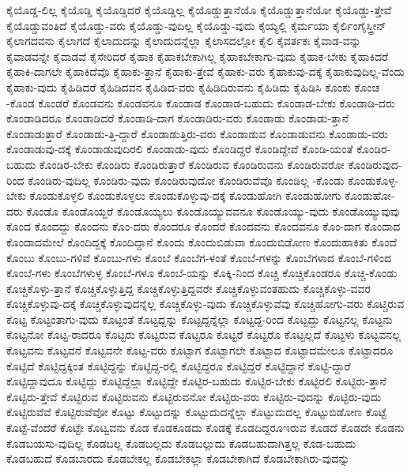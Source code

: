 {ಕೈಯೊಡ್ಡ-ಲಿಲ್ಲ
ಕೈಯೊಡ್ಡಿ
ಕೈಯೊಡ್ಡಿದರೆ
ಕೈಯೊಡ್ಡಿಲ್ಲ
ಕೈಯೊಡ್ಡುತ್ತಾನೆಯೊ
ಕೈಯೊಡ್ಡುತ್ತಾನೆಯೋ
ಕೈಯೊಡ್ಡು-ತ್ತೇವೆ
ಕೈಯೊಡ್ಡುವಂತಿದೆ
ಕೈಯೊಡ್ಡು-ವರು
ಕೈಯೊಡ್ಡು-ವುದಿಲ್ಲ
ಕೈಯೊಡ್ಡು-ವುದು
ಕೈಯ್ಯಲ್ಲಿ
ಕೈರ್ಮಯಾ
ಕೈರ್ಲಿಂಗೈಸ್ತ್ರೀನ್
ಕೈಲಾಗದವನು
ಕೈಲಾಗದೆ
ಕೈಲಾದುದನ್ನು
ಕೈಲಾದುದನ್ನೆಲ್ಲಾ
ಕೈಲಾಸದಲ್ಲೋ
ಕೈಲಿ
ಕೈವರ್ತಕಃ
ಕೈವಾಡ-ವನ್ನು
ಕೈವಾಡವನ್ನೇ
ಕೈವಾಡವೆ
ಕೈಸೇರಿದರೆ
ಕೈಹಾಕ
ಕೈಹಾಕಬೇಕಾಗಿಲ್ಲ
ಕೈಹಾಕಬೇಕಾಗು-ವುದು
ಕೈಹಾಕ-ಬೇಕು
ಕೈಹಾಕಿದರೆ
ಕೈಹಾಕಿ-ದಾಗಲೇ
ಕೈಹಾಕಿದೆವೊ
ಕೈಹಾಕು-ತ್ತಾನೆ
ಕೈಹಾಕು-ತ್ತೇವೆ
ಕೈಹಾಕು-ವರು
ಕೈಹಾಕುವು-ದಕ್ಕೆ
ಕೈಹಾಕುವುದಿಲ್ಲ-ವೆಂದು
ಕೈಹಾಕು-ವುದು
ಕೈಹಿಡಿದರೆ
ಕೈಹಿಡಿದವನ
ಕೈಹಿಡಿದ-ವರು
ಕೈಹಿಡಿದಿರುವನು
ಕೈಹಿಡಿದು
ಕೈಹಿಡಿಸಿ
ಕೊಂಕು
ಕೊಂಚ
-ಕೊಂಡ
ಕೊಂಡರೆ
ಕೊಂಡವನು
ಕೊಂಡವನೂ
ಕೊಂಡಾಡ
ಕೊಂಡಾಡ-ಬಹುದು
ಕೊಂಡಾಡ-ಬೇಕು
ಕೊಂಡಾಡಿ-ದರು
ಕೊಂಡಾಡಿದರೂ
ಕೊಂಡಾಡಿದರೆ
ಕೊಂಡಾಡಿ-ದಾಗ
ಕೊಂಡಾಡಿರು-ವರು
ಕೊಂಡಾಡು
ಕೊಂಡಾಡು-ತ್ತಾನೆ
ಕೊಂಡಾಡುತ್ತಾರೆ
ಕೊಂಡಾಡು-ತ್ತಿ-ದ್ದಾರೆ
ಕೊಂಡಾಡುತ್ತಿರು-ವರು
ಕೊಂಡಾಡುವ
ಕೊಂಡಾಡುವನು
ಕೊಂಡಾಡು-ವರು
ಕೊಂಡಾಡುವು-ದಕ್ಕೆ
ಕೊಂಡಾಡುವುದಿರಲಿ
ಕೊಂಡಾಡು-ವುದು
ಕೊಂಡಿದ್ದರೆ
ಕೊಂಡಿದ್ದೇವೆ
ಕೊಂಡಿ-ಯಂತೆ
ಕೊಂಡಿರ-ಬಹುದು
ಕೊಂಡಿರ-ಬೇಕು
ಕೊಂಡಿರು
ಕೊಂಡಿರುತ್ತಾರೆ
ಕೊಂಡಿರುವ
ಕೊಂಡಿರುವನು
ಕೊಂಡಿರುವರೋ
ಕೊಂಡಿರುವುದ-ರಿಂದ
ಕೊಂಡಿರು-ವುದಿಲ್ಲ
ಕೊಂಡಿರು-ವುದು
ಕೊಂಡಿರುವುದೋ
ಕೊಂಡಿರುವೆವೊ
ಕೊಂಡಿಲ್ಲ
-ಕೊಂಡು
ಕೊಂಡುಕೊಳ್ಳ-ಬೇಕು
ಕೊಂಡುಕೊಳ್ಳಲಿ
ಕೊಂಡುಕೊಳ್ಳಲು
ಕೊಂಡುಕೊಳ್ಳುವು-ದಕ್ಕೆ
ಕೊಂಡುಹೋಗಿ
ಕೊಂಡುಹೋಗು
ಕೊಂಡುಹೋ-ದರು
ಕೊಂಡೊ
ಕೊಂಡೊಯ್ದರೆ
ಕೊಂಡೊಯ್ಯಲು
ಕೊಂಡೊಯ್ಯುವವನೂ
ಕೊಂಡೊಯ್ಯು-ವುದು
ಕೊಂಡೊಯ್ಯುವುವು
ಕೊಂದ
ಕೊಂದದ್ದು
ಕೊಂದನು
ಕೊಂ-ದರು
ಕೊಂದರೂ
ಕೊಂದರೆ
ಕೊಂದವನು
ಕೊಂದವನೂ
ಕೊಂ-ದಾಗ
ಕೊಂದಾದ
ಕೊಂದಾದಮೇಲೆ
ಕೊಂದಿದ್ದಕ್ಕೆ
ಕೊಂದಿದ್ದಾನೆ
ಕೊಂದು
ಕೊಂದುಬಿಡುವಾ
ಕೊಂದುಬಿಡೋಣ
ಕೊಂದುಹಾಕಿತು
ಕೊಂದೆ
ಕೊಂಬು
ಕೊಂಬು-ಗಳಿವೆ
ಕೊಂಬು-ಗಳು
ಕೊಂಬೆ
ಕೊಂಬೆಗ-ಳಂತೆ
ಕೊಂಬೆ-ಗಳನ್ನು
ಕೊಂಬೆಗಳಾದ
ಕೊಂಬೆ-ಗಳಿಂದ
ಕೊಂಬೆ-ಗಳು
ಕೊಂಬೆಗಳುಳ್ಳ
ಕೊಂಬೆ-ಗಳೂ
ಕೊಂಬೆ-ಯನ್ನು
ಕೊಕ್ಕಿ-ನಿಂದ
ಕೊಚ್ಚಿ
ಕೊಚ್ಚಿಕೊಂಡರೂ
ಕೊಚ್ಚಿ-ಕೊಂಡು
ಕೊಚ್ಚಿಕೊಳ್ಳು-ತ್ತಾನೆ
ಕೊಚ್ಚಿಕೊಳ್ಳುತ್ತಿದ್ದ
ಕೊಚ್ಚಿಕೊಳ್ಳುತ್ತಿದ್ದವರೇ
ಕೊಚ್ಚಿಕೊಳ್ಳುವಂತಹುದು
ಕೊಚ್ಚಿಕೊಳ್ಳು-ವವರ
ಕೊಚ್ಚಿಕೊಳ್ಳುವು-ದಕ್ಕೆ
ಕೊಚ್ಚಿಕೊಳ್ಳುವುದನ್ನೆಲ್ಲ
ಕೊಚ್ಚಿಕೊಳ್ಳು-ವುದು
ಕೊಚ್ಚಿಕೊಳ್ಳುವೆವು
ಕೊಚ್ಚಿಹೋಗು-ವರು
ಕೊಟ್ಚಿರುವ
ಕೊಟ್ಟ
ಕೊಟ್ಟಂತಾಗು-ವುದು
ಕೊಟ್ಟಂತೆ
ಕೊಟ್ಟದ್ದನ್ನು
ಕೊಟ್ಟದ್ದನ್ನೆಲ್ಲಾ
ಕೊಟ್ಟದ್ದ-ರಿಂದ
ಕೊಟ್ಟದ್ದು
ಕೊಟ್ಟನಲ್ಲ
ಕೊಟ್ಟನು
ಕೊಟ್ಟನೋ
ಕೊಟ್ಟ-ರಾದರೂ
ಕೊಟ್ಟರು
ಕೊಟ್ಟರುವ
ಕೊಟ್ಟರೂ
ಕೊಟ್ಟರೆ
ಕೊಟ್ಟರೊ
ಕೊಟ್ಟಲ್ಲದೆ
ಕೊಟ್ಟಳು
ಕೊಟ್ಟವನಲ್ಲ
ಕೊಟ್ಟವನು
ಕೊಟ್ಟವನೆ
ಕೊಟ್ಟವನೇ
ಕೊಟ್ಟ-ವರು
ಕೊಟ್ಟಾಗ
ಕೊಟ್ಟಾಗಲೇ
ಕೊಟ್ಟಾದ
ಕೊಟ್ಟಾದಮೇಲೂ
ಕೊಟ್ಟಾದರೂ
ಕೊಟ್ಟಿದೆ
ಕೊಟ್ಟಿದ್ದಕ್ಕಿಂತ
ಕೊಟ್ಟಿದ್ದನ್ನು
ಕೊಟ್ಟಿದ್ದ-ರಲ್ಲಿ
ಕೊಟ್ಟಿದ್ದರೂ
ಕೊಟ್ಟಿದ್ದರೆ
ಕೊಟ್ಟಿದ್ದಾನೆ
ಕೊಟ್ಟಿ-ದ್ದಾರೆ
ಕೊಟ್ಟಿದ್ದಾವುದೂ
ಕೊಟ್ಟಿದ್ದು
ಕೊಟ್ಟಿದ್ದೆಲ್ಲಾ
ಕೊಟ್ಟಿದ್ದೇ
ಕೊಟ್ಟಿರ-ಬಹುದು
ಕೊಟ್ಟಿರ-ಬೇಕು
ಕೊಟ್ಟಿರಲಿ
ಕೊಟ್ಟಿರು-ತ್ತಾನೆ
ಕೊಟ್ಟಿರು-ತ್ತೇವೆ
ಕೊಟ್ಟಿರುವ
ಕೊಟ್ಟಿರುವನು
ಕೊಟ್ಟಿರುವನೋ
ಕೊಟ್ಟಿರು-ವರು
ಕೊಟ್ಟಿರು-ವುದನ್ನು
ಕೊಟ್ಟಿರು-ವುದು
ಕೊಟ್ಟಿರುವೆವೆ
ಕೊಟ್ಟಿರುವೆವೋ
ಕೊಟ್ಟು
ಕೊಟ್ಟುದನ್ನು
ಕೊಟ್ಟುದುದನ್ನೆಲ್ಲಾ
ಕೊಟ್ಟುದುದಲ್ಲ
ಕೊಟ್ಟುಬಿಡೋಣ
ಕೊಟ್ಟೆ
ಕೊಟ್ಟೆ-ವೆಂದರೆ
ಕೊಟ್ಟೇ
ಕೊಟ್ವವನು
ಕೊಡ
ಕೊಡಕೂಡದು
ಕೊಡಕ್ಕೆ
ಕೊಡದಿದ್ದರೂಇರುವ
ಕೊಡದೆ
ಕೊಡದೇ
ಕೊಡನು
ಕೊಡಬಯಸು-ವುದಿಲ್ಲ
ಕೊಡಬಲ್ಲ
ಕೊಡಬಲ್ಲದು
ಕೊಡಬಲ್ಲುದು
ಕೊಡಬಹುದಾಗಿತ್ತಲ್ಲ
ಕೊಡ-ಬಹುದು
ಕೊಡಬಹುದೆ
ಕೊಡಬಾರದು
ಕೊಡಬೇಕಲ್ಲ
ಕೊಡಬೇಕಲ್ಲಾ
ಕೊಡಬೇಕಾಗಿದೆ
ಕೊಡಬೇಕಾಗಿರು-ವುದನ್ನು
}
